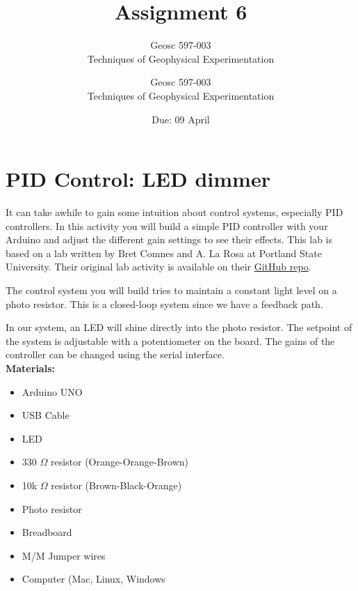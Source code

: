 \documentclass[10pt]{article}
\title{Assignment #1} %
\author{Geosc 597-003 \\
		Techniques of Geophysical Experimentation} %
\date{Due: #2}
\newcommand{\titler}[2]{
	\title{Assignment #1} %
	\author{Geosc 597-003 \\
		Techniques of Geophysical Experimentation} %
	\date{Due: #2}
	
	\maketitle}
\begin{document}

\titler{6}{09 April}

\section*{PID Control: LED dimmer}

It can take awhile to gain some intuition about control systems, especially PID controllers. In this activity you will build a simple PID controller with your Arduino and adjust the different gain settings to see their effects. This lab is based on a lab written by Bret Comnes and A. La Rosa at Portland State University. Their original lab activity is available on their \href{https://github.com/bcomnes/315-lab-microcontroller/blob/master/Arduino%2BPID%2BLab.pdf}{GitHub repo}.

The control system you will build tries to maintain a constant light level on a photo resistor. This is a closed-loop system since we have a feedback path. 

In our system, an LED will shine directly into the photo resistor. The setpoint of the system is adjustable with a potentiometer on the board. The gains of the controller can be changed using the serial interface.  \\ 

\noindent \textbf{Materials:}
\begin{multicols}{2}
	{\small \begin{itemize}
		\item Arduino UNO
		\item USB Cable
		\item LED
		\item 330 $ \Omega $ resistor (Orange-Orange-Brown)
		\item 10k $ \Omega $ resistor (Brown-Black-Orange)
		\item Photo resistor
		\item Breadboard
		\item M/M Jumper wires
		\item Computer (Mac, Linux, Windows
	\end{itemize}}
\end{multicols}
\end{document}
